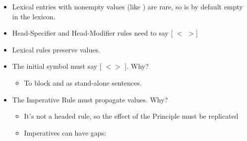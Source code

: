 \documentclass[a4paper,landscape,headrule,footrule]{foils}
\newcommand{\bx}[1]{\avmbox{\smaller #1}}
\begin{document}



\begin{itemize}
\item Lexical entries with nonempty 
values (like ) are rare, so  is by
default empty in the lexicon.
\item Head-Specifier and Head-Modifier rules need to
say [ $<$ $>$]
\item Lexical rules preserve  values.
\end{itemize}

\begin{itemize}
\item[Q] The initial symbol must say [ $< >$ ]. Why?
  \begin{itemize}
  \item[A] To block  and  as
    stand-alone sentences.
  \end{itemize}
\item[Q] The Imperative Rule must propagate  values.
  Why?
  \begin{itemize}
  \item[A] It's not a headed rule, so the effect of the 
    Principle must be replicated
  \item [A] Imperatives can have gaps:
    \\ 
  \end{itemize}
\end{itemize}
\end{document}
